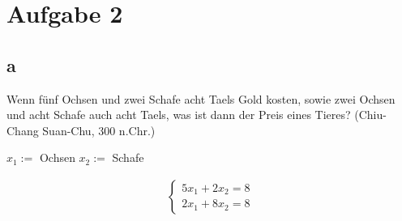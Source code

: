 \section{Aufgabe 2}

\subsection{a}
Wenn fünf Ochsen und zwei Schafe acht Taels Gold kosten, sowie zwei Ochsen und
acht Schafe auch acht Taels, was ist dann der Preis eines Tieres? (Chiu-Chang
Suan-Chu, 300 n.Chr.)

$x_1 :=$ Ochsen \quad $x_2 :=$ Schafe

\begin{align*}
  \begin{cases}
    5x_1 + 2x_2 = 8 \\
    2x_1 + 8x_2 = 8
  \end{cases}
\end{align*}

